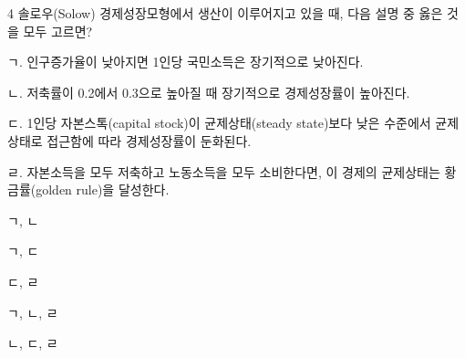 \begin{question}{4}
솔로우(Solow) 경제성장모형에서 생산이 이루어지고 있을 때, 다음 설명 중 옳은 것을 모두 고르면?
\begin{framedtext}
ㄱ. 인구증가율이 낮아지면 1인당 국민소득은 장기적으로 낮아진다. \par
ㄴ. 저축률이 0.2에서 0.3으로 높아질 때 장기적으로 경제성장률이 높아진다. \par
ㄷ. 1인당 자본스톡(capital stock)이 균제상태(steady state)보다 낮은 수준에서 균제상태로 접근함에 따라 경제성장률이 둔화된다. \par
ㄹ. 자본소득을 모두 저축하고 노동소득을 모두 소비한다면, 이 경제의 균제상태는 황금률(golden rule)을 달성한다. \par
\end{framedtext}
\begin{choices}
  \item ㄱ, ㄴ
  \item ㄱ, ㄷ
  \item ㄷ, ㄹ
  \item ㄱ, ㄴ, ㄹ
  \item ㄴ, ㄷ, ㄹ
\end{choices}
\end{question}
